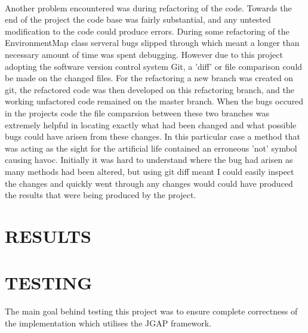 \documentclass[10pt,twocolumn]{article}
\begin{document}
\paragraph{}
Another problem encountered was during refactoring of the code. Towards the end of the project the code base was fairly substantial, and any
untested modification to the code could produce errors. During some refactoring of the EnvironmentMap class serveral bugs slipped through
which meant a longer than necessary amount of time was spent debugging. However due to this project adopting the software version control system
Git, a 'diff' or file comparison could be made on the changed files. For the refactoring a new branch was created on git, the refactored code
was then developed on this refactoring branch, and the working unfactored code remained on the master branch. When the bugs occured in the
projects code the file comparsion between these two branches was extremely helpful in locating exactly what had been changed and what
possible bugs could have arisen from these changes. In this particular case a method that was acting as the sight for the artificial life
contained an erroneous 'not' symbol causing havoc. Initially it was hard to understand where the bug had arisen as many methods had been
altered, but using git diff meant I could easily inspect the changes and quickly went through any changes would could have produced the
results that were being produced by the project.

\section{RESULTS}

\section{TESTING}
The main goal behind testing this project was to ensure complete correctness of the implementation which utilises the JGAP framework.
\end{document}
